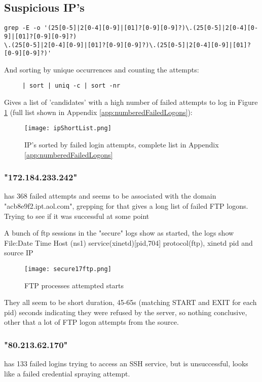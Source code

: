 \documentclass[
	letterpaper, %
	10pt, %
	unnumberedsections, %
	twoside, %
]{APAAssignment}
\begin{document}
\subsection{Suspicious IP's}
\begin{verbatim}
grep -E -o '(25[0-5]|2[0-4][0-9]|[01]?[0-9][0-9]?)\.(25[0-5]|2[0-4][0-9]|[01]?[0-9][0-9]?)
\.(25[0-5]|2[0-4][0-9]|[01]?[0-9][0-9]?)\.(25[0-5]|2[0-4][0-9]|[01]?[0-9][0-9]?)'
\end{verbatim}

And sorting by unique occurrences and counting the attempts:

\begin{verbatim}
	 | sort | uniq -c | sort -nr
\end{verbatim}

Gives a list of 'candidates' with a high number of failed attempts to log in Figure \ref{fig:ipShortList} (full list shown in Appendix \ref{app:numberedFailedLogons}):

\begin{figure}[!htp] %
	\centering
	\texttt{[image: ipShortList.png]}
	\caption{IP's sorted by failed login attempts, complete list in Appendix \ref{app:numberedFailedLogons}}
	\label{fig:ipShortList}
\end{figure}

\subsubsection{"172.184.233.242"}
has 368 failed attempts and seems to be associated with the domain "acb8e9f2.ipt.aol.com", grepping for that gives a long list of failed FTP logons. Trying to see if it was successful at some point

A bunch of ftp sessions in the "secure" logs show as started, the logs show File:Date Time Host (ns1) service(xinetd)[pid,704] protocol(ftp), xinetd pid and source IP
\begin{figure}[!htp] %
	\centering
	\texttt{[image: secure17ftp.png]}
	\caption{FTP processes attempted starts}
	\label{fig:secure17ftp}
\end{figure}

They all seem to be short duration, 45-65s (matching START and EXIT for each pid) seconds indicating they were refused by the server, so nothing conclusive, other that a lot of FTP logon attempts from the source.


\subsubsection{"80.213.62.170"}
has 133 failed logins trying to access an SSH service, but is unsuccessful, looks like a failed credential spraying attempt.
\end{document}
